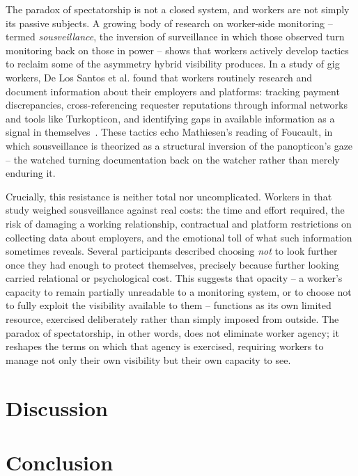 \documentclass[11pt]{article}
\begin{document}
The paradox of spectatorship is not a closed system, and workers are
not simply its passive subjects. A growing body of research on
worker-side monitoring -- termed \textit{sousveillance}, the
inversion of surveillance in which those observed turn monitoring
back on those in power -- shows that workers actively develop
tactics to reclaim some of the asymmetry hybrid visibility produces.
In a study of gig workers, De Los Santos et al. found that workers
routinely research and document information about their employers
and platforms: tracking payment discrepancies, cross-referencing
requester reputations through informal networks and tools like
Turkopticon, and identifying gaps in available information as a
signal in themselves~\citep{delossantos2024}. These tactics echo
Mathiesen's reading of Foucault, in which sousveillance is theorized
as a structural inversion of the panopticon's gaze -- the watched
turning documentation back on the watcher rather than merely
enduring it.

Crucially, this resistance is neither total nor uncomplicated.
Workers in that study weighed sousveillance against real costs: the
time and effort required, the risk of damaging a working
relationship, contractual and platform restrictions on collecting
data about employers, and the emotional toll of what such
information sometimes reveals. Several participants described
choosing \emph{not} to look further once they had enough to protect
themselves, precisely because further looking carried relational or
psychological cost. This suggests that opacity -- a worker's
capacity to remain partially unreadable to a monitoring system, or
to choose not to fully exploit the visibility available to
them -- functions as its own limited resource, exercised
deliberately rather than simply imposed from outside. The paradox of
spectatorship, in other words, does not eliminate worker agency; it
reshapes the terms on which that agency is exercised, requiring
workers to manage not only their own visibility but their own
capacity to see.

\section{Discussion}
\label{sec:discussion}


\section{Conclusion}
\label{sec:conclusion}




\end{document}
